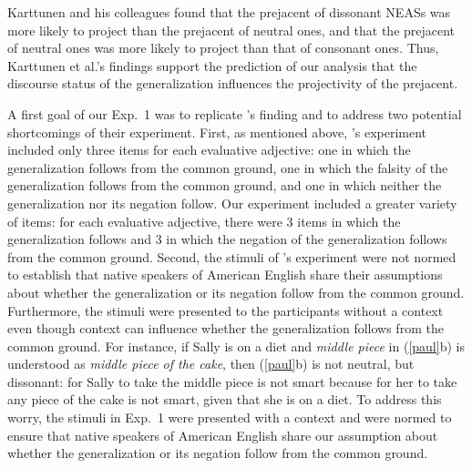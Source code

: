 \documentclass[11pt,fleqn]{article}
\newcommand{\6}{\mbox{$[\hspace*{-.6mm}[$}}
\newcommand{\9}{\mbox{$]\hspace*{-.6mm}]$}}
\newcommand{\citepos}[1]{\citeauthor{#1}'s \citeyear{#1}}
\begin{document}
Karttunen and his colleagues found that the prejacent of dissonant NEASs was more likely to project than the prejacent of neutral ones, and that the prejacent of neutral ones was more likely to project than that of consonant ones. Thus, Karttunen et al.'s findings support the prediction of our analysis that the discourse status of the generalization influences the projectivity of the prejacent.

A first goal of our Exp.~1 was to replicate \citepos{karttunen-etal2014} finding and to address two potential shortcomings of their experiment. First, as mentioned above, \citepos{karttunen-etal2014} experiment included only three items for each evaluative adjective: one in which the generalization follows from the common ground, one in which the falsity of the generalization follows from the common ground, and one in which neither the generalization nor its negation follow. Our experiment included a greater variety of items: for each evaluative adjective, there were 3 items in which the generalization follows and 3 in which the negation of the generalization follows from the common ground. Second, the stimuli of  \citepos{karttunen-etal2014} experiment were not normed to establish that native speakers of American English share their assumptions about whether the generalization or its negation follow from the common ground. Furthermore, the stimuli were
presented to the participants without a context even though context can influence whether the generalization follows from the common ground. For instance, if Sally is on a diet and {\em middle piece} in (\ref{paul}b) is understood as {\em middle piece of the cake}, then (\ref{paul}b) is not neutral, but dissonant: for Sally to take the middle piece is not smart because for her to take any piece of the cake is not smart, given that she is on a diet. To address this worry, the stimuli in Exp.~1 were presented with a context and were normed to ensure that native speakers of American English share our assumption about whether the generalization or its negation follow from the common ground.
\end{document}
